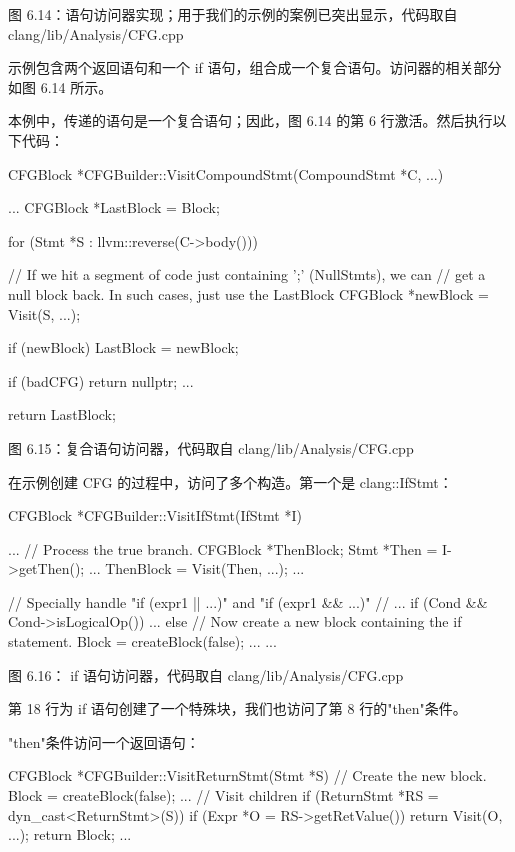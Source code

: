 \begin{center}
图 6.14：语句访问器实现；用于我们的示例的案例已突出显示，代码取自 clang/lib/Analysis/CFG.cpp
\end{center}

示例包含两个返回语句和一个 if 语句，组合成一个复合语句。访问器的相关部分如图 6.14 所示。

本例中，传递的语句是一个复合语句；因此，图 6.14 的第 6 行激活。然后执行以下代码：

\begin{cpp}
CFGBlock *CFGBuilder::VisitCompoundStmt(CompoundStmt *C, ...) {
  ...
  CFGBlock *LastBlock = Block;

  for (Stmt *S : llvm::reverse(C->body())) {
    // If we hit a segment of code just containing ';' (NullStmts), we can
    // get a null block back.  In such cases, just use the LastBlock
    CFGBlock *newBlock = Visit(S, ...);

    if (newBlock)
      LastBlock = newBlock;

    if (badCFG)
      return nullptr;
    ...
  }

  return LastBlock;
}
\end{cpp}


\begin{center}
图 6.15：复合语句访问器，代码取自 clang/lib/Analysis/CFG.cpp
\end{center}

在示例创建 CFG 的过程中，访问了多个构造。第一个是 clang::IfStmt：

\begin{cpp}
CFGBlock *CFGBuilder::VisitIfStmt(IfStmt *I) {
  ...
  // Process the true branch.
  CFGBlock *ThenBlock;
  {
    Stmt *Then = I->getThen();
    ...
    ThenBlock = Visit(Then, ...);
    ...
  }

  // Specially handle "if (expr1 || ...)" and "if (expr1 && ...)"
  // ...
  if (Cond && Cond->isLogicalOp())
    ...
  else {
    // Now create a new block containing the if statement.
    Block = createBlock(false);
    ...
  }
  ...
}
\end{cpp}

\begin{center}
图 6.16： if 语句访问器，代码取自 clang/lib/Analysis/CFG.cpp
\end{center}

第 18 行为 if 语句创建了一个特殊块，我们也访问了第 8 行的"then"条件。

"then"条件访问一个返回语句：

\begin{cpp}
CFGBlock *CFGBuilder::VisitReturnStmt(Stmt *S) {
  // Create the new block.
  Block = createBlock(false);
  ...
  // Visit children
  if (ReturnStmt *RS = dyn_cast<ReturnStmt>(S)) {
    if (Expr *O = RS->getRetValue())
      return Visit(O, ...);
    return Block;
  }
  ...
}
\end{cpp}

